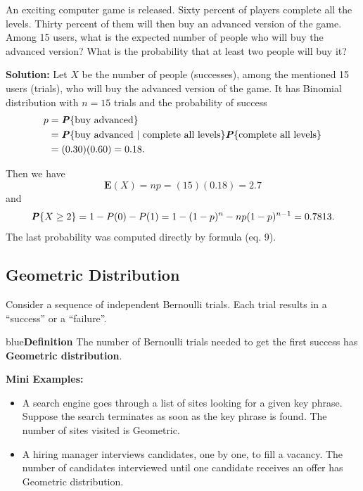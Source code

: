 \documentclass{article}
\newenvironment{example_break}[1]{\begin{mybox}[breakable]{green}{\textbf{Example #1}}}{\end{mybox}}
\newenvironment{definition}[1]{\begin{mybox}{blue}{\textbf{Definition #1}}}{\end{mybox}}
\newcommand{\prob}[1]{\textbf{\textit{P}}\{#1\}}
\begin{document}
\begin{example_break}{}
An exciting computer game is released. Sixty percent of players complete all the levels. Thirty percent of them will then buy an advanced version of the game. Among 15 users, what is the expected number of people who will buy the advanced version? What is the probability that at least two people will buy it?

\newpage
\textbf{Solution:}
Let $X$ be the number of people (successes), among the mentioned 15 users (trials), who will buy the advanced version of the game. It has Binomial distribution with $n = 15$ trials and the probability of success
\begin{align*}
    p &= \prob{\text{buy advanced}}\\
    &= \prob{\text{buy advanced $|$ complete all levels}} \prob{\text{complete all levels}}\\
    &= (0.30)(0.60) = 0.18.
\end{align*}

Then we have
\begin{equation*}
    \mathbf{E}(X) = np = (15)(0.18) = 2.7
\end{equation*}
and
\begin{equation*}
    \prob{X \geq 2} = 1 - P(0) - P(1) = 1 - (1 - p)^n - np(1 - p)^{n-1} = 0.7813.
\end{equation*}
The last probability was computed directly by formula (eq. 9).
\end{example_break}

\subsection{Geometric Distribution}

Consider a sequence of independent Bernoulli trials. Each trial results in a ``success'' or a ``failure''.
\begin{definition}{}
The number of Bernoulli trials needed to get the first success has \textbf{Geometric distribution}.
\end{definition}

\noindent \textbf{Mini Examples:}
\begin{itemize}
    \item A search engine goes through a list of sites looking for a given key phrase. Suppose the search terminates as soon as the key phrase is found. The number of sites visited is Geometric.
    \item A hiring manager interviews candidates, one by one, to fill a vacancy. The number of candidates interviewed until one candidate receives an offer has Geometric distribution.
\end{itemize}
\end{document}
